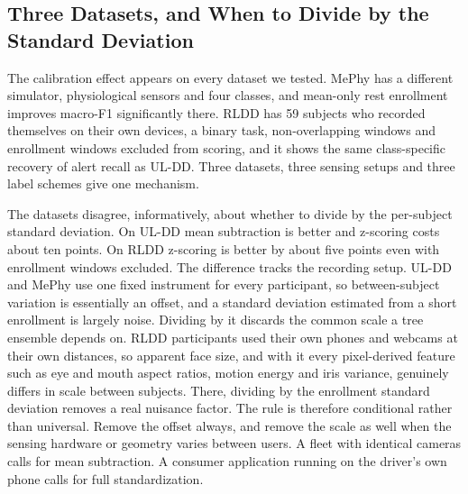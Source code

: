 \documentclass[journal]{IEEEtran}
\begin{document}
\subsection{Three Datasets, and When to Divide by the Standard Deviation}
The calibration effect appears on every dataset we tested. MePhy has a
different simulator, physiological sensors and four classes, and mean-only
rest enrollment improves macro-F1 significantly there. RLDD has 59 subjects
who recorded themselves on their own devices, a binary task, non-overlapping
windows and enrollment windows excluded from scoring, and it shows the same
class-specific recovery of alert recall as UL-DD. Three datasets, three
sensing setups and three label schemes give one mechanism.

The datasets disagree, informatively, about whether to divide by the
per-subject standard deviation. On UL-DD mean subtraction is better and
z-scoring costs about ten points. On RLDD z-scoring is better by about five points
even with enrollment windows excluded. The difference tracks the recording
setup. UL-DD and MePhy use one fixed instrument for every participant, so
between-subject variation is essentially an offset, and a standard deviation
estimated from a short enrollment is largely noise. Dividing by it discards
the common scale a tree ensemble depends on. RLDD participants used their own
phones and webcams at their own distances, so apparent face size, and with it
every pixel-derived feature such as eye and mouth aspect ratios, motion energy
and iris variance, genuinely differs in scale between subjects. There,
dividing by the enrollment standard deviation removes a real nuisance factor.
The rule is therefore conditional rather than universal. Remove the offset
always, and remove the scale as well when the sensing hardware or geometry
varies between users. A fleet with identical cameras calls for mean
subtraction. A consumer application running on the driver's own phone calls
for full standardization.
\end{document}
